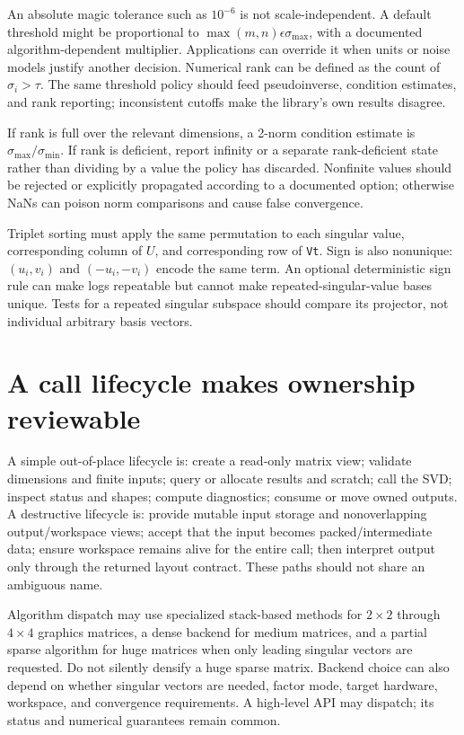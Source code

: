 An absolute magic tolerance such as \(10^{-6}\) is not scale-independent. A default threshold might be proportional to \(\max(m,n)\epsilon\sigma_{\max}\), with a documented algorithm-dependent multiplier. Applications can override it when units or noise models justify another decision. Numerical rank can be defined as the count of \(\sigma_i>\tau\). The same threshold policy should feed pseudoinverse, condition estimates, and rank reporting; inconsistent cutoffs make the library's own results disagree.

If rank is full over the relevant dimensions, a 2-norm condition estimate is \(\sigma_{\max}/\sigma_{\min}\). If rank is deficient, report infinity or a separate rank-deficient state rather than dividing by a value the policy has discarded. Nonfinite values should be rejected or explicitly propagated according to a documented option; otherwise NaNs can poison norm comparisons and cause false convergence.

Triplet sorting must apply the same permutation to each singular value, corresponding column of \(U\), and corresponding row of \texttt{Vt}. Sign is also nonunique: \((u_i,v_i)\) and \((-u_i,-v_i)\) encode the same term. An optional deterministic sign rule can make logs repeatable but cannot make repeated-singular-value bases unique. Tests for a repeated singular subspace should compare its projector, not individual arbitrary basis vectors.

\section{A call lifecycle makes ownership reviewable}\label{02-foundations-ii-ch038-a-call-lifecycle-makes-ownership-reviewable}

A simple out-of-place lifecycle is: create a read-only matrix view; validate dimensions and finite inputs; query or allocate results and scratch; call the SVD; inspect status and shapes; compute diagnostics; consume or move owned outputs. A destructive lifecycle is: provide mutable input storage and nonoverlapping output/workspace views; accept that the input becomes packed/intermediate data; ensure workspace remains alive for the entire call; then interpret output only through the returned layout contract. These paths should not share an ambiguous name.

Algorithm dispatch may use specialized stack-based methods for \(2\times2\) through \(4\times4\) graphics matrices, a dense backend for medium matrices, and a partial sparse algorithm for huge matrices when only leading singular vectors are requested. Do not silently densify a huge sparse matrix. Backend choice can also depend on whether singular vectors are needed, factor mode, target hardware, workspace, and convergence requirements. A high-level API may dispatch; its status and numerical guarantees remain common.

